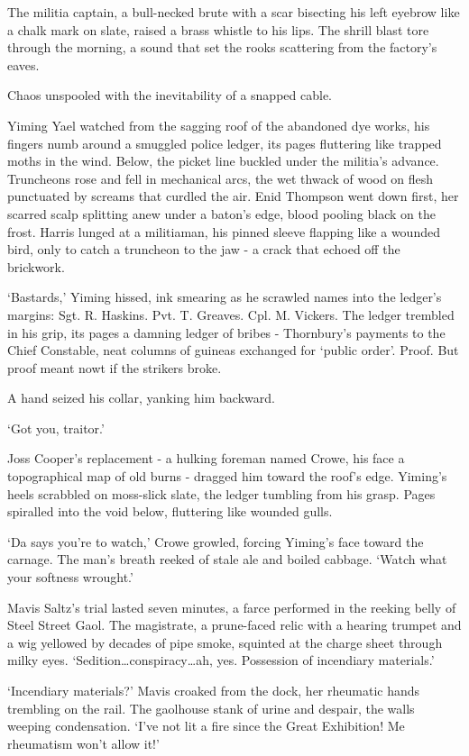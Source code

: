The militia captain, a bull-necked brute with a scar bisecting his left eyebrow like a chalk mark on slate, raised a brass whistle to his lips. The shrill blast tore through the morning, a sound that set the rooks scattering from the factory's eaves.

Chaos unspooled with the inevitability of a snapped cable.

Yiming Yael watched from the sagging roof of the abandoned dye works, his fingers numb around a smuggled police ledger, its pages fluttering like trapped moths in the wind. Below, the picket line buckled under the militia's advance. Truncheons rose and fell in mechanical arcs, the wet thwack of wood on flesh punctuated by screams that curdled the air. Enid Thompson went down first, her scarred scalp splitting anew under a baton's edge, blood pooling black on the frost. Harris lunged at a militiaman, his pinned sleeve flapping like a wounded bird, only to catch a truncheon to the jaw - a crack that echoed off the brickwork.

`Bastards,' Yiming hissed, ink smearing as he scrawled names into the ledger's margins: Sgt. R. Haskins. Pvt. T. Greaves. Cpl. M. Vickers. The ledger trembled in his grip, its pages a damning ledger of bribes - Thornbury's payments to the Chief Constable, neat columns of guineas exchanged for `public order'. Proof. But proof meant nowt if the strikers broke.

A hand seized his collar, yanking him backward.

`Got you, traitor.'

Joss Cooper's replacement - a hulking foreman named Crowe, his face a topographical map of old burns - dragged him toward the roof's edge. Yiming's heels scrabbled on moss-slick slate, the ledger tumbling from his grasp. Pages spiralled into the void below, fluttering like wounded gulls.

`Da says you're to watch,' Crowe growled, forcing Yiming's face toward the carnage. The man's breath reeked of stale ale and boiled cabbage. `Watch what your softness wrought.'

Mavis Saltz's trial lasted seven minutes, a farce performed in the reeking belly of Steel Street Gaol. The magistrate, a prune-faced relic with a hearing trumpet and a wig yellowed by decades of pipe smoke, squinted at the charge sheet through milky eyes. `Sedition\dots conspiracy\dots ah, yes. Possession of incendiary materials.'

`Incendiary materials?' Mavis croaked from the dock, her rheumatic hands trembling on the rail. The gaolhouse stank of urine and despair, the walls weeping condensation. `I've not lit a fire since the Great Exhibition! Me rheumatism won't allow it!'

